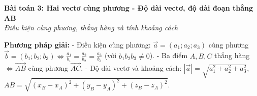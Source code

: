 \documentclass[12pt,a4paper]{article}
\newenvironment{lesson}[2]{
	\vspace{1em}\noindent\textbf{\Large #1}\\
	\textit{#2}\vspace{0.5em}
}{}
\begin{document}

\begin{lesson}{Bài toán 3: Hai vectơ cùng phương - Độ dài vectơ, độ dài đoạn thẳng AB}{Điều kiện cùng phương, thẳng hàng và tính khoảng cách}

\textbf{Phương pháp giải:}
- Điều kiện cùng phương: $\vec{a} = (a_1; a_2; a_3)$ cùng phương $\vec{b} = (b_1; b_2; b_3) \Leftrightarrow \frac{a_1}{b_1} = \frac{a_2}{b_2} = \frac{a_3}{b_3}$ (với $b_1 b_2 b_3 \ne 0$).
- Ba điểm $A, B, C$ thẳng hàng $\Leftrightarrow \vec{AB}$ cùng phương $\vec{AC}$.
- Độ dài vectơ và khoảng cách: $|\vec{a}| = \sqrt{a_1^2 + a_2^2 + a_3^2}$, $AB = \sqrt{(x_B - x_A)^2 + (y_B - y_A)^2 + (z_B - z_A)^2}$.

\end{lesson}
\end{document}
